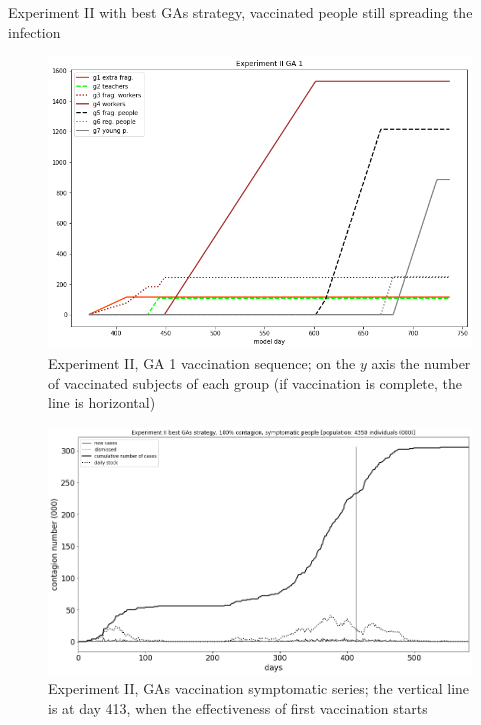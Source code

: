 \documentclass[8pt]{beamer}
\begin{document}
\begin{frame}{Experiment II with best GAs strategy, vaccinated people still spreading the infection}

\begin{figure}[H]
\center
\includegraphics[scale=0.14]{Experiment_II_GA_1_VaccinationSequence.png} %

\caption{Experiment II, GA 1 vaccination sequence; on the $y$ axis the number of vaccinated subjects of each group (if vaccination is complete, the line is horizontal)} 
\label{Experiment_II_GA1VaccinationSequence}
\end{figure}

\begin{figure}[H]
\center
\includegraphics[scale=0.16]{Experiment_II_1_GAs_symptomatic_series.png} 

\caption{Experiment II, GAs vaccination symptomatic series; the vertical line is at day 413, when the effectiveness of first vaccination starts} 
\label{Experiment_II_GAs1SymptomaticSeries}
\end{figure}


\end{frame}
\end{document}
